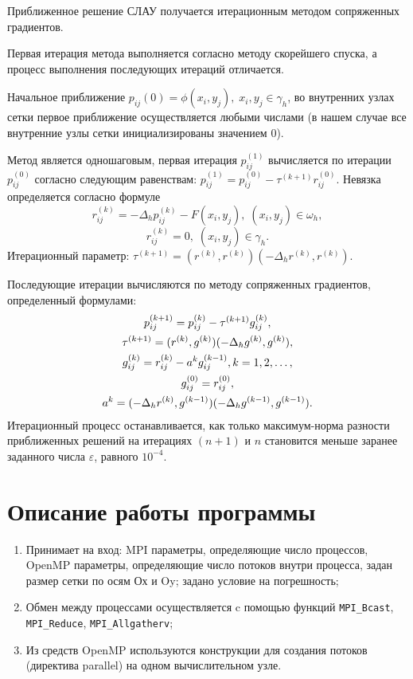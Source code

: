 \documentclass[12pt]{article}
\theoremstyle{rusdef}
\begin{document}
	Приближенное решение СЛАУ получается итерационным методом сопряженных градиентов.
	
	Первая итерация метода выполняется согласно методу скорейшего спуска, а процесс выполнения последующих итераций отличается.
	
	Начальное приближение $p_{ij}(0)= \phi(x_i,y_j), \; x_i,y_j \in \gamma_h$, во внутренних узлах сетки первое приближение осуществляется любыми числами (в нашем случае все внутренние узлы сетки инициализированы значением $0$).
	
	Метод является одношаговым, первая итерация $p_{ij}^{(1)}$ вычисляется по итерации $p_{ij}^{(0)}$ согласно следующим равенствам:
	$p_{ij}^{(1)}=p_{ij}^{(0)}-\tau^{(k+1)}r_{ij}^{(0)}$.
	Невязка определяется согласно формуле
	$$
	r_{ij}^{(k)}= -\Delta_h p_{ij}^{(k)}-F(x_i,y_j), \; (x_i,y_j) \in \omega_h,
	$$
	$$
	r_{ij}^{(k)}=0, \; (x_i,y_j)\in \gamma_h.
	$$
	Итерационный параметр:
	$\tau^{(k+1)}= (r^{(k)},r^{(k)})(-\Delta_h r^{(k)},r^{(k)})$.
	
	
	Последующие итерации вычисляются по методу сопряженных градиентов, определенный формулами:
	\begin{gather}
	p_{ij}^{(k+1)}=p_{ij}^{(k)}-\tau^{(k+1)} g_{ij}^{(k)}, \notag \\
	\tau^{(k+1)}= (r^{(k)},g^{(k)})(-\Delta_h g^{(k)},g^{(k)}), \notag \\
	g_{ij}^{(k)}=r_{ij}^{(k)}-a^k g_{ij}^{(k-1)}, k=1,2,\ldots, \notag \\
	g_{ij}^{(0)}=r_{ij}^{(0)}, \notag \\
	a^k= (-\Delta_h r^{(k)},g^{(k-1)})(-\Delta_h g^{(k-1)},g^{(k-1)}). \notag
	\end{gather}
	Итерационный процесс останавливается, как только максимум-норма разности приближенных решений на итерациях $(n+1)$ и $n$ становится меньше заранее заданного числа $\varepsilon$, равного $10^{-4}$.
	
	
	\section{Описание работы программы}
	\begin{enumerate}
	\item Принимает на вход: MPI параметры, определяющие число процессов, OpenMP параметры, определяющие число потоков внутри процесса, задан размер сетки по осям Ох и Oy; задано условие на погрешность;
	\item Обмен между процессами осуществляется c помощью функций \texttt{MPI\_Bcast}, \texttt{MPI\_Reduce}, \texttt{MPI\_Allgatherv};
	\item Из средств OpenMP используются конструкции для создания потоков (директива parallel) на одном вычислительном узле.
	\end{enumerate}
	
\end{document}
